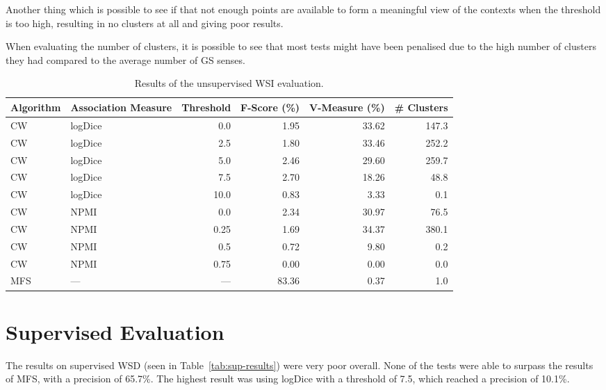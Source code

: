 Another thing which is possible to see if that not enough points are available
to form a meaningful view of the contexts when the threshold is too high,
resulting in no clusters at all and giving poor results.

When evaluating the number of clusters, it is possible to see that most tests
might have been penalised due to the high number of clusters they had compared
to the average number of \ac{GS} senses.

\begin{table}[ht]
\caption{Results of the unsupervised \ac*{WSI} evaluation.}
\label{tab:unsup-results}
\begin{tabu} to \textwidth {Xlrrrr}
\hline
\textbf{Algorithm} & \textbf{Association Measure} & \textbf{Threshold} & \textbf{F-Score (\%)} & \textbf{V-Measure (\%)} & \textbf{\# Clusters} \\
\hline
\ac{CW} & logDice   &  0.0 &  1.95 & 33.62 & 147.3 \\
\ac{CW} & logDice   &  2.5 &  1.80 & 33.46 & 252.2 \\
\ac{CW} & logDice   &  5.0 &  2.46 & 29.60 & 259.7 \\
\ac{CW} & logDice   &  7.5 &  2.70 & 18.26 &  48.8 \\
\ac{CW} & logDice   & 10.0 &  0.83 &  3.33 &   0.1 \\
\hline
\ac{CW} & \ac{NPMI} & 0.0  &  2.34 & 30.97 &  76.5 \\
\ac{CW} & \ac{NPMI} & 0.25 &  1.69 & 34.37 & 380.1 \\
\ac{CW} & \ac{NPMI} & 0.5  &  0.72 &  9.80 &   0.2 \\
\ac{CW} & \ac{NPMI} & 0.75 &  0.00 &  0.00 &   0.0 \\
\hline
\ac{MFS} &      --- &  --- & 83.36 &  0.37 &   1.0 \\
\hline
\end{tabu}
\end{table}

\section{Supervised Evaluation}

The results on supervised \ac{WSD} (seen in Table~\ref{tab:sup-results}) were
very poor overall. None of the tests were able to surpass the results of
\ac{MFS}, with a precision of 65.7\%. The highest result was using logDice with
a threshold of 7.5, which reached a precision of 10.1\%.

